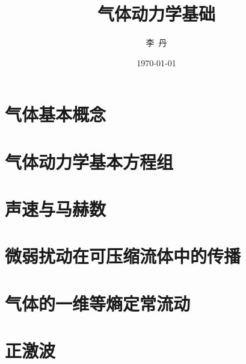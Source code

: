 \documentclass{SWRHE_Beamer}
\begin{document}
\title{气体动力学基础}
\author{李~丹}
\date{\today}
\frame{\titlepage}


\section{气体基本概念}


\section{气体动力学基本方程组}


\section{声速与马赫数}


\section{微弱扰动在可压缩流体中的传播}


\section{气体的一维等熵定常流动}


\section{正激波}


%
\end{document}
